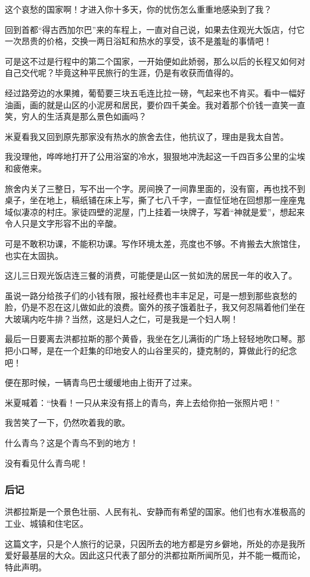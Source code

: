 \par 这个哀愁的国家啊！才进入你十多天，你的忧伤怎么重重地感染到了我？
\par 回到首都“得古西加尔巴”来的车程上，一直对自己说，如果去住观光大饭店，付它一次昂贵的价格，交换一两日浴缸和热水的享受，该不是羞耻的事情吧！
\par 可是这不过是行程中的第二个国家，一开始便如此娇弱，那么以后的长程又如何对自己交代呢？毕竟这种平民旅行的生涯，仍是有收获而值得的。
\par 经过路旁边的水果摊，葡萄要三块五毛连比拉一磅，气起来也不肯买。看中一幅好油画，画的就是山区的小泥房和居民，要价四千美金。我对着那个价钱一直笑一直笑，穷人的生活真是那么景色如画吗？
\par 米夏看我又回到原先那家没有热水的旅舍去住，他抗议了，理由是我太自苦。
\par 我没理他，哗哗地打开了公用浴室的冷水，狠狠地冲洗起这一千四百多公里的尘埃和疲倦来。
\par 旅舍内关了三整日，写不出一个字。房间换了一间靠里面的，没有窗，再也找不到桌子，坐在地上，稿纸铺在床上写，撕了七八千字，一直怔怔地在回想那一座座鬼域似凄凉的村庄。家徒四壁的泥屋，门上挂着一块牌子，写着“神就是爱”，想起来令人只是文字形容不出的辛酸。
\par 可是不敢积功课，不能积功课。写作环境太差，亮度也不够。不肯搬去大旅馆住，也实在太固执。
\par 这儿三日观光饭店连三餐的消费，可能便是山区一贫如洗的居民一年的收入了。
\par 虽说一路分给孩子们的小钱有限，报社经费也丰丰足足，可是一想到那些哀愁的脸，仍是不忍在这儿做如此的浪费。窗外的孩子饿着肚子，我又何忍隔着他们坐在大玻璃内吃牛排？当然，这是妇人之仁，可是我是一个妇人啊！
\par 最后一日要离去洪都拉斯的那个黄昏，我坐在乞儿满街的广场上轻轻地吹口琴。那把小口琴，是在一个赶集的印地安人的山谷里买的，捷克制的，算做此行的纪念吧！
\par 便在那时候，一辆青鸟巴士缓缓地由上街开了过来。
\par 米夏喊着：“快看！一只从来没有搭上的青鸟，奔上去给你拍一张照片吧！”
\par 我苦笑了一下，仍然吹着我的歌。
\par 什么青鸟？这是个青鸟不到的地方！
\par 没有看见什么青鸟呢！

\subsubsection*{后记}
\par 洪都拉斯是一个景色壮丽、人民有礼、安静而有希望的国家。他们也有水准极高的工业、城镇和住宅区。
\par 这篇文字，只是个人旅行的记录，只因所去的地方都是穷乡僻地，所处的亦是我所爱好最基层的大众。因此这只代表了部分的洪都拉斯所闻所见，并不能一概而论，特此声明。

